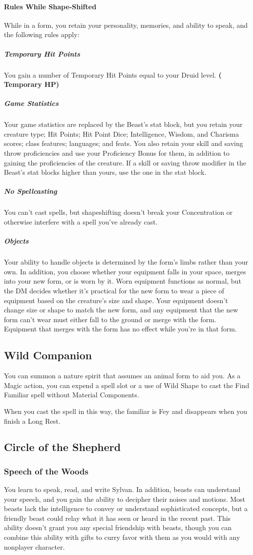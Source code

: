 \documentclass[letterpaper,openany,oneside,twocolumn]{book}
\begin{document}
\paragraph*{Rules While Shape-Shifted} While in a form, you retain your personality, memories, and ability to speak, and the following rules apply:
\subparagraph*{Temporary Hit Points} You gain a number of Temporary Hit Points equal to your Druid level. \textbf{( Temporary HP)}
\subparagraph*{Game Statistics} Your game statistics are replaced by the Beast's stat block, but you retain your creature type; Hit Points; Hit Point Dice; Intelligence, Wisdom, and Charisma scores; class features; languages; and feats. You also retain your skill and saving throw proficiencies and use your Proficiency Bonus for them, in addition to gaining the proficiencies of the creature. If a skill or saving throw modifier in the Beast's stat blocks higher than yours, use the one in the stat block.
\subparagraph*{No Spellcasting} You can't cast spells, but shapeshifting doesn't break your Concentration or otherwise interfere with a spell you've already cast.
\subparagraph*{Objects} Your ability to handle objects is determined by the form's limbs rather than your own. In addition, you choose whether your equipment falls in your space, merges into your new form, or is worn by it. Worn equipment functions as normal, but the DM decides whether it's practical for the new form to wear a piece of equipment based on the creature's size and shape. Your equipment doesn't change size or shape to match the new form, and any equipment that the new form can't wear must either fall to the ground or merge with the form. Equipment that merges with the form has no effect while you're in that form.
\subsection*{Wild Companion}
You can summon a nature spirit that assumes an animal form to aid you. As a Magic action, you can expend a spell slot or a use of Wild Shape to cast the Find Familiar spell without Material Components.

When you cast the spell in this way, the familiar is Fey and disappears when you finish a Long Rest.
\subsection*{Circle of the Shepherd}
\subsubsection*{Speech of the Woods}
You learn to speak, read, and write Sylvan. In addition, beasts can understand your speech, and you gain the ability to decipher their noises and motions. Most beasts lack the intelligence to convey or understand sophisticated concepts, but a friendly beast could relay what it has seen or heard in the recent past. This ability doesn't grant you any special friendship with beasts, though you can combine this ability with gifts to curry favor with them as you would with any nonplayer character.
\end{document}

